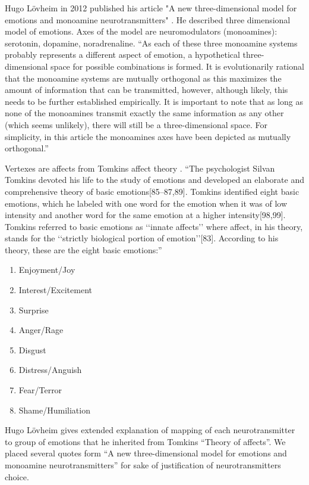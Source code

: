 Hugo L\"{o}vheim in 2012 published his article "A new three-dimensional model for emotions and monoamine neurotransmitters" \cite{cubeofemotions}. He described three dimensional model of emotions. Axes of the model are neuromodulators (monoamines): serotonin, dopamine, noradrenaline. ``As each of these three monoamine systems probably represents a different aspect of emotion, a hypothetical three-dimensional space for possible combinations is formed. It is evolutionarily rational that the monoamine systems are mutually orthogonal as this maximizes the amount of information that can be transmitted, however, although likely, this needs to be further established empirically. It is important to note that as long as none of the monoamines transmit exactly the same information as any other (which seems unlikely), there will still be a three-dimensional space. For simplicity, in this article the monoamines axes have been depicted as mutually orthogonal.''

Vertexes are affects from Tomkins affect theory \cite{primer_affect_psychology}. ``The psychologist Silvan Tomkins devoted his life to the study of emotions and developed an elaborate and comprehensive theory of basic emotions[85–87,89]. Tomkins identified eight basic emotions, which he labeled with one word for the emotion when it was of low intensity and another word for the same emotion at a higher intensity[98,99]. Tomkins referred to basic emotions as ‘‘innate affects’’ where affect, in his theory, stands for the ‘‘strictly biological portion of emotion’’[83]. According to his theory, these are the eight basic emotions:''

\begin{enumerate}
 \item  Enjoyment/Joy
 \item  Interest/Excitement
 \item  Surprise
 \item  Anger/Rage
 \item  Disgust
 \item  Distress/Anguish
 \item  Fear/Terror
 \item  Shame/Humiliation
\end{enumerate}

Hugo L\"{o}vheim gives extended explanation of mapping of each neurotransmitter to group of emotions that he inherited from Tomkins ``Theory of affects''. We placed several quotes form ``A new three-dimensional model for emotions and monoamine neurotransmitters'' \cite{cubeofemotions} for sake of justification of neurotransmitters choice.


